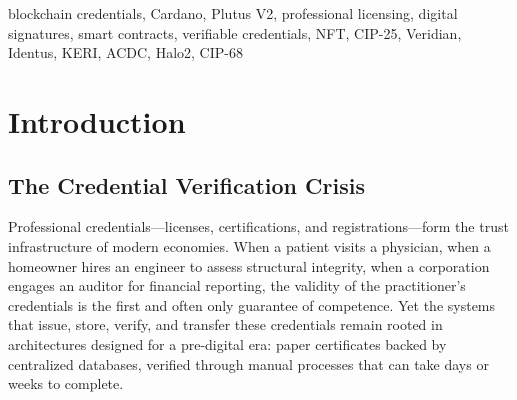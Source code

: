 \documentclass[conference,10pt]{IEEEtran}
\begin{document}
\begin{abstract}
This paper presents a blockchain-based credential verification architecture built on the Cardano platform that addresses these systemic failures. The system employs Plutus V2 smart contracts to enforce authority-restricted minting policies, CIP-25 metadata standards for on-chain credential representation, and native multi-asset tokens for signature and validity credentials. By leveraging Cardano's extended UTXO model and its native token architecture, the system achieves lower transaction costs than Ethereum-based alternatives while providing mathematically verifiable issuance provenance. The architecture separates credential attestation (on-chain, immutable) from personal data storage (off-chain, erasable), satisfying both blockchain immutability requirements and data privacy regulations including GDPR's right to erasure. We describe the complete system design---from HD wallet generation following CIP-1852 through Plutus V2 minting policies, multi-signature collection validators, and dues enforcement contracts---and evaluate its performance against eight existing blockchain credential systems. The proposed architecture fills an identified gap: no existing system combines Cardano-native NFT credentials (CIP-68) with Plutus-enforced issuance policies, authority-controlled on-chain revocation via datum updates, and cross-jurisdiction license portability within a unified framework.
\end{abstract}

\begin{IEEEkeywords}
blockchain credentials, Cardano, Plutus V2, professional licensing, digital signatures, smart contracts, verifiable credentials, NFT, CIP-25, Veridian, Identus, KERI, ACDC, Halo2, CIP-68
\end{IEEEkeywords}

\section{Introduction}

\subsection{The Credential Verification Crisis}

Professional credentials---licenses, certifications, and registrations---form the trust infrastructure of modern economies. When a patient visits a physician, when a homeowner hires an engineer to assess structural integrity, when a corporation engages an auditor for financial reporting, the validity of the practitioner's credentials is the first and often only guarantee of competence. Yet the systems that issue, store, verify, and transfer these credentials remain rooted in architectures designed for a pre-digital era: paper certificates backed by centralized databases, verified through manual processes that can take days or weeks to complete.
\end{document}
